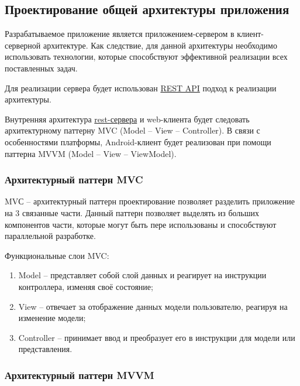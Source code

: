 \subsection{Проектирование общей архитектуры приложения}\label{subsec:2-design-architecure}\indent

Разрабатываемое приложение является приложением-сервером в клиент-серверной архитектуре.
Как следствие, для данной архитектуры необходимо использовать технологии, которые способствуют эффективной реализации всех поставленных задач.


Для реализации сервера будет использован \hyperlink{gloss:rest}{REST API} подход к реализации архитектуры.

Внутренняя архитектура \hyperlink{gloss:rest}{rest-сервера} и web-клиента будет следовать архитектурному паттерну MVC (Model – View – Controller).
В связи с особенностями платформы, Android-клиент будет реализован при помощи паттерна MVVM (Model – View – ViewModel).

\subsubsection{Архитектурный паттерн MVC}\indent


MVС – архитектурный паттерн проектирование позволяет разделить приложение на 3 связанные части.
Данный паттерн позволяет выделять из больших компонентов части, которые могут быть пере использованы и способствуют параллельной разработке.

Функциональные слои MVC:
\begin{enumerate}
    \item Model – представляет собой слой данных и реагирует на инструкции контроллера, изменяя своё состояние;
    \item View – отвечает за отображение данных модели пользователю, реагируя на изменение модели;
    \item Controller – принимает ввод и преобразует его в инструкции для модели или представления.
\end{enumerate}

\subsubsection{Архитектурный паттерн MVVM}\indent

